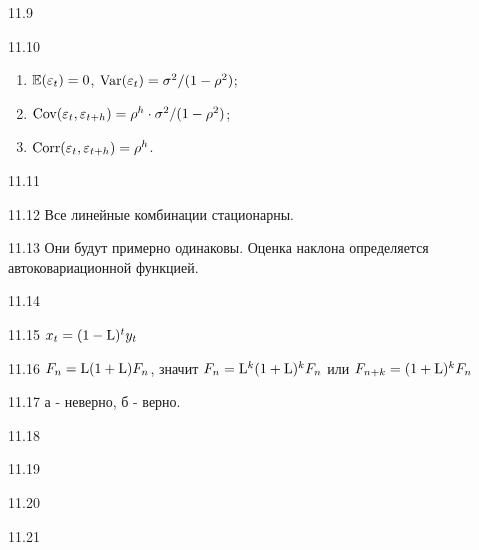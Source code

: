 \protect \hypertarget {soln:11.9}{}
\begin{solution}{{11.9}}
\end{solution}
\protect \hypertarget {soln:11.10}{}
\begin{solution}{{11.10}}
\begin{enumerate}
\item $\mathbb{E}(\varepsilon_t)=0$, $\operatorname{Var}(\varepsilon_t)=\sigma^2/(1-\rho^2)$;
\item $\operatorname{Cov}(\varepsilon_t,\varepsilon_{t+h})=\rho^h\cdot \sigma^2/(1-\rho^2)$;
\item $\operatorname{Corr}(\varepsilon_t,\varepsilon_{t+h})=\rho^h$.
\end{enumerate}
\end{solution}
\protect \hypertarget {soln:11.11}{}
\begin{solution}{{11.11}}
\end{solution}
\protect \hypertarget {soln:11.12}{}
\begin{solution}{{11.12}}
Все линейные комбинации стационарны.
\end{solution}
\protect \hypertarget {soln:11.13}{}
\begin{solution}{{11.13}}
Они будут примерно одинаковы. Оценка наклона определяется автоковариационной функцией.
\end{solution}
\protect \hypertarget {soln:11.14}{}
\begin{solution}{{11.14}}
\end{solution}
\protect \hypertarget {soln:11.15}{}
\begin{solution}{{11.15}}
$x_{t}=(1-\mathrm{L} )^{t}y_{t}$
\end{solution}
\protect \hypertarget {soln:11.16}{}
\begin{solution}{{11.16}}
$ F_{n}=\mathrm{L} (1+\mathrm{L} )F_{n} $, значит $ F_{n}=\mathrm{L} ^{k}(1+\mathrm{L} )^{k}F_{n} $ или $ F_{n+k}=(1+\mathrm{L} )^{k}F_{n} $
\end{solution}
\protect \hypertarget {soln:11.17}{}
\begin{solution}{{11.17}}
а - неверно, б - верно.
\end{solution}
\protect \hypertarget {soln:11.18}{}
\begin{solution}{{11.18}}
\end{solution}
\protect \hypertarget {soln:11.19}{}
\begin{solution}{{11.19}}
\end{solution}
\protect \hypertarget {soln:11.20}{}
\begin{solution}{{11.20}}
\end{solution}
\protect \hypertarget {soln:11.21}{}
\begin{solution}{{11.21}}
\end{solution}
